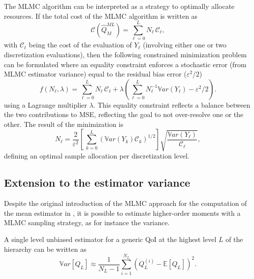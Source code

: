 The MLMC algorithm can be interpreted as a strategy to optimally allocate 
resources. If the total cost of the MLMC algorithm is written as  
\begin{equation}\label{EQ: MLMC cost}
\mathcal{C}(\hat{Q}^{ML}_{M}) = \sum_{\ell=0}^{L} N_\ell \, \mathcal{C}_{\ell},
\end{equation}
with $\mathcal{C}_{\ell}$ being the cost of the evaluation of $Y_\ell$ (involving either one or two discretization evaluations), then the following constrained minimization problem can be formulated where an equality constraint enforces a stochastic error (from MLMC estimator variance) equal to the residual bias error ($\varepsilon^2/2$)
\begin{equation}\label{EQ:mlmc_optimization}
 f(N_\ell,\lambda) = \sum_{\ell=0}^{L} N_\ell \, \mathcal{C}_{\ell} 
                   + \lambda \left( \sum_{\ell=0}^{L} N_\ell^{-1} \mathbb{V}ar\left({Y_\ell}\right) - \varepsilon^2/2 \right). 
\end{equation}
using a Lagrange multiplier $\lambda$.  This equality constraint reflects a balance between the two contributions to MSE, reflecting the goal to not over-resolve one or the other.  The result of the minimization is
\begin{equation}\label{EQ: MLMC nl}
N_{\ell} = \frac{2}{\varepsilon^2} \left[ \, \sum_{k=0}^L \left( \mathbb{V}ar\left(Y_k\right) \mathcal{C}_k \right)^{1/2} \right] 
               \sqrt{\frac{ \mathbb{V}ar\left({Y_\ell}\right) }{\mathcal{C}_{\ell}}},
\end{equation}
defining an optimal sample allocation per discretization level.

\subsection{Extension to the estimator variance}
Despite the original introduction of the MLMC approach for the computation of the mean estimator in \cite{Giles2008,Giles2015}, it is 
possible to estimate higher-order moments with a MLMC sampling strategy, as for instance the variance.

A single level unbiased estimator for a generic QoI at the highest level $L$ of the hierarchy can be written as
\begin{equation}
\label{eq: variance_est_single_level}
 \mathbb{V}ar\left[Q_L\right] \approx \frac{1}{N_L - 1} \sum_{i=1}^{N_L} \left( Q_L^{(i)} - \mathbb{E}\left[Q_L\right] \right)^2.
\end{equation}

